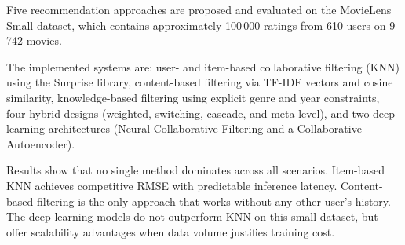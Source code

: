 Five recommendation approaches are proposed and evaluated on the MovieLens Small dataset, which contains approximately 100\,000 ratings from 610 users on 9\,742 movies.

The implemented systems are: user- and item-based collaborative filtering (KNN) using the Surprise library, content-based filtering via TF-IDF vectors and cosine similarity, knowledge-based filtering using explicit genre and year constraints, four hybrid designs (weighted, switching, cascade, and meta-level), and two deep learning architectures (Neural Collaborative Filtering and a Collaborative Autoencoder).

Results show that no single method dominates across all scenarios. Item-based KNN achieves competitive RMSE with predictable inference latency. Content-based filtering is the only approach that works without any other user's history. The deep learning models do not outperform KNN on this small dataset, but offer scalability advantages when data volume justifies training cost.
